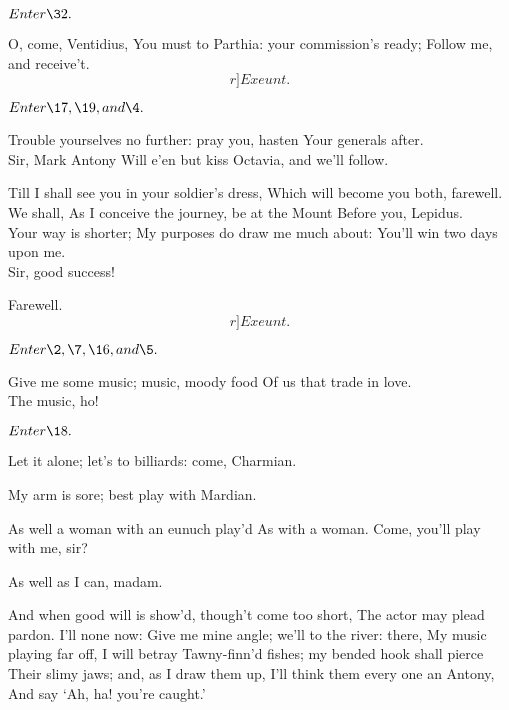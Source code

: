 \documentclass{book}
\begin{document}
	\(Enter \32.\)

		        O, come, Ventidius,
	You must to Parthia: your commission's ready;
	Follow me, and receive't.  \[r]Exeunt.\]






	\(Enter \17, \19, and \4.\)

	Trouble yourselves no further: pray you, hasten
	Your generals after. \\

\4	Sir, Mark Antony
	Will e'en but kiss Octavia, and we'll follow.

	Till I shall see you in your soldier's dress,
	Which will become you both, farewell. \\

	We shall,
	As I conceive the journey, be at the Mount
	Before you, Lepidus. \\

	Your way is shorter;
	My purposes do draw me much about:
	You'll win two days upon me. \\

 \4	Sir, good success!

	Farewell. 	\[r]Exeunt.\]





	\(Enter \2, \7, \16, and \5.\)

\2	Give me some music; music, moody food
	Of us that trade in love. \\

	The music, ho!

	\(Enter \18.\)

\2	Let it alone; let's to billiards: come, Charmian.

\7	My arm is sore; best play with Mardian.

\2	As well a woman with an eunuch play'd
	As with a woman. Come, you'll play with me, sir?

	As well as I can, madam.

\2	And when good will is show'd, though't come 	too short,
	The actor may plead pardon. I'll none now:
	Give me mine angle; we'll to the river: there,
	My music playing far off, I will betray
	Tawny-finn'd fishes; my bended hook shall pierce
	Their slimy jaws; and, as I draw them up,
	I'll think them every one an Antony,
	And say `Ah, ha! you're caught.' \\
\end{document}
